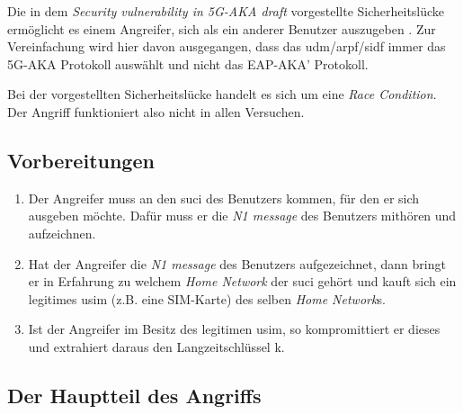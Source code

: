 Die in dem \textit{Security vulnerability in 5G-AKA draft} vorgestellte Sicherheitslücke ermöglicht es einem Angreifer, sich als ein anderer Benutzer auszugeben \cite{vulnerability}.
Zur Vereinfachung wird hier davon ausgegangen, dass das \gls{udm}/\gls{arpf}/\gls{sidf} immer das 5G-AKA Protokoll auswählt und nicht das EAP-AKA' Protokoll.

Bei der vorgestellten Sicherheitslücke  handelt es sich um eine \textit{Race Condition}.
Der Angriff funktioniert also nicht in allen Versuchen.

\subsection{Vorbereitungen}

\begin{enumerate}
\item Der Angreifer muss an den \gls{suci} des Benutzers kommen, für den er sich ausgeben möchte.
Dafür muss er die \textit{N1 message} des Benutzers mithören und aufzeichnen.

\item Hat der Angreifer die \textit{N1 message} des Benutzers aufgezeichnet, dann bringt er in Erfahrung zu welchem \textit{Home Network} der \gls{suci} gehört und kauft sich ein legitimes \gls{usim} (z.B. eine SIM-Karte) des selben \textit{Home Network}s.

\item Ist der Angreifer im Besitz des legitimen \gls{usim}, so kompromittiert er dieses und extrahiert daraus den Langzeitschlüssel \gls{k}.

\end{enumerate}

\subsection{Der Hauptteil des Angriffs}

